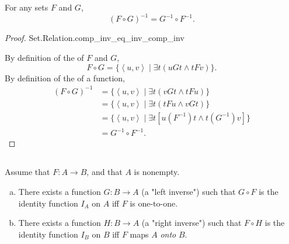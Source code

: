 \documentclass{report}
\newcommand{\pair}[1]{\left< #1 \right>}
\begin{document}
\subsection{}%

\begin{theorem}[3I]

  For any sets $F$ and $G$, $$(F \circ G)^{-1} = G^{-1} \circ F^{-1}.$$

\end{theorem}

\begin{proof}

    {Set.Relation.comp\_inv\_eq\_inv\_comp\_inv}

  By definition of the  of $F$ and $G$,
    $$F \circ G = \{\pair{u, v} \mid \exists t(uGt \land tFv)\}.$$
  By definition of the  of a function,
    \begin{align*}
      (F \circ G)^{-1}
        & = \{\pair{u, v} \mid \exists t (vGt \land tFu)\} \\
        & = \{\pair{u, v} \mid \exists t (tFu \land vGt)\} \\
        & = \{\pair{u, v} \mid
          \exists t \left[ u(F^{-1})t \land t(G^{-1})v \right]\} \\
        & = G^{-1} \circ F^{-1}.
    \end{align*}

\end{proof}

\subsection{}%

\begin{theorem}[3J]

  Assume that $F \colon A \rightarrow B$, and that $A$ is nonempty.
  \begin{enumerate}[(a)]
    \item There exists a function $G \colon B \rightarrow A$ (a "left inverse")
      such that $G \circ F$ is the identity function $I_A$ on $A$ iff $F$ is
      one-to-one.
    \item There exists a function $H \colon B \rightarrow A$ (a "right inverse")
      such that $F \circ H$ is the identity function $I_B$ on $B$ iff $F$ maps
      $A$ \textit{onto} $B$.
  \end{enumerate}

\end{theorem}
\end{document}
